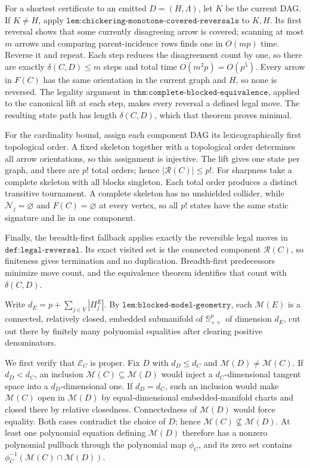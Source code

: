 For a shortest certificate to an emitted \(D=(H,\Lambda)\), let \(K\) be the current DAG. If \(K\neq H\), apply \(\texttt{lem:chickering-monotone-covered-reversals}\) to \(K,H\). Its first reversal shows that some currently disagreeing arrow is covered; scanning at most \(m\) arrows and comparing parent-incidence rows finds one in \(O(mp)\) time. Reverse it and repeat. Each step reduces the disagreement count by one, so there are exactly \(\delta(C,D)\leq m\) steps and total time \(O(m^2p)=O(p^5)\). Every arrow in \(F(C)\) has the same orientation in the current graph and \(H\), so none is reversed. The legality argument in \(\texttt{thm:complete-blocked-equivalence}\), applied to the canonical lift at each step, makes every reversal a defined legal move. The resulting state path has length \(\delta(C,D)\), which that theorem proves minimal.

For the cardinality bound, assign each component DAG its lexicographically first topological order. A fixed skeleton together with a topological order determines all arrow orientations, so this assignment is injective. The lift gives one state per graph, and there are \(p!\) total orders; hence \(|\mathcal R(C)|\leq p!\). For sharpness take a complete skeleton with all blocks singleton. Each total order produces a distinct transitive tournament. A complete skeleton has no unshielded collider, while \(\mathcal N_j=\varnothing\) and \(F(C)=\varnothing\) at every vertex, so all \(p!\) states have the same static signature and lie in one component.

Finally, the breadth-first fallback applies exactly the reversible legal moves in \(\texttt{def:legal-reversal}\). Its exact visited set is the connected component \(\mathcal R(C)\), so finiteness gives termination and no duplication. Breadth-first predecessors minimize move count, and the equivalence theorem identifies that count with \(\delta(C,D)\).

Write \(d_E=p+\sum_{j\in V}|\Pi^E_j|\). By \(\texttt{lem:blocked-model-geometry}\), each \(\mathcal M(E)\) is a connected, relatively closed, embedded submanifold of \(\mathbb S^p_{++}\) of dimension \(d_E\), cut out there by finitely many polynomial equalities after clearing positive denominators.

We first verify that \(\mathcal E_C\) is proper. Fix \(D\) with \(d_D\leq d_C\) and \(\mathcal M(D)\neq\mathcal M(C)\). If \(d_D<d_C\), an inclusion \(\mathcal M(C)\subseteq\mathcal M(D)\) would inject a \(d_C\)-dimensional tangent space into a \(d_D\)-dimensional one. If \(d_D=d_C\), such an inclusion would make \(\mathcal M(C)\) open in \(\mathcal M(D)\) by equal-dimensional embedded-manifold charts and closed there by relative closedness. Connectedness of \(\mathcal M(D)\) would force equality. Both cases contradict the choice of \(D\); hence \(\mathcal M(C)\nsubseteq\mathcal M(D)\). At least one polynomial equation defining \(\mathcal M(D)\) therefore has a nonzero polynomial pullback through the polynomial map \(\phi_C\), and its zero set contains \(\phi_C^{-1}(\mathcal M(C)\cap\mathcal M(D))\).

